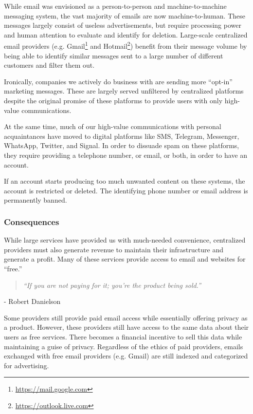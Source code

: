 \documentclass{article}
\newcommand{\chapquote}[2]{\begin{quotation} \textit{#1} \end{quotation} \begin{flushright} - #2\end{flushright} }
\begin{document}
While email was envisioned as a person-to-person and machine-to-machine messaging system, the vast majority of emails are now machine-to-human. These messages largely consist of useless advertisements, but require processing power and human attention to evaluate and identify for deletion. Large-scale centralized email providers (e.g. Gmail\footnote{\url{https://mail.google.com}} and Hotmail\footnote{\url{https://outlook.live.com}}) benefit from their message volume by being able to identify similar messages sent to a large number of different customers and filter them out.

Ironically, companies we actively do business with are sending more ``opt-in'' marketing messages. These are largely served unfiltered by centralized platforms despite the original promise of these platforms to provide users with only high-value communications.

At the same time, much of our high-value communications with personal acquaintances have moved to digital platforms like SMS, Telegram, Messenger, WhatsApp, Twitter, and Signal. In order to dissuade spam on these platforms, they require providing a telephone number, or email, or both, in order to have an account.

If an account starts producing too much unwanted content on these systems, the account is restricted or deleted. The identifying phone number or email address is permanently banned.

\subsubsection{Consequences}

While large services have provided us with much-needed convenience, centralized providers must also generate revenue to maintain their infrastructure and generate a profit. Many of these services provide access to email and websites for ``free.''

\chapquote{\large ``If you are not paying for it; you're the product being sold.''}{Robert Danielson}

Some providers still provide paid email access while essentially offering privacy as a product. However, these providers still have access to the same data about their users as free services. There becomes a financial incentive to sell this data while maintaining a guise of privacy. Regardless of the ethics of paid providers, emails exchanged with free email providers (e.g. Gmail) are still indexed and categorized for advertising.
\end{document}
